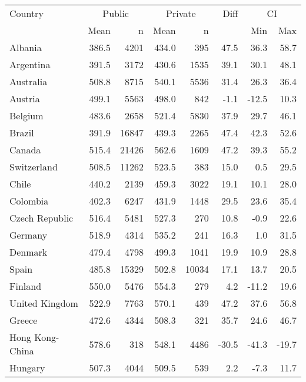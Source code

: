 \begin{table}[ht]
\begin{center}
{\smaller
\begin{tabular}{lrr@{\extracolsep{10pt}}rr@{\extracolsep{10pt}}rrr}
  \hline
  Country & \multicolumn{2}{c}{Public} & \multicolumn{2}{c}{Private} & Diff & \multicolumn{2}{c}{CI} \\ \cline{2-3} \cline{4-5} \cline{7-8} & Mean & n & Mean & n & & Min & Max \\ \hline
Albania & 386.5 & 4201 & 434.0 & 395 & 47.5 & 36.3 & 58.7 \\ 
  Argentina & 391.5 & 3172 & 430.6 & 1535 & 39.1 & 30.1 & 48.1 \\ 
  Australia & 508.8 & 8715 & 540.1 & 5536 & 31.4 & 26.3 & 36.4 \\ 
  Austria & 499.1 & 5563 & 498.0 & 842 & -1.1 & -12.5 & 10.3 \\ 
  Belgium & 483.6 & 2658 & 521.4 & 5830 & 37.9 & 29.7 & 46.1 \\ 
  Brazil & 391.9 & 16847 & 439.3 & 2265 & 47.4 & 42.3 & 52.6 \\ 
  Canada & 515.4 & 21426 & 562.6 & 1609 & 47.2 & 39.3 & 55.2 \\ 
  Switzerland & 508.5 & 11262 & 523.5 & 383 & 15.0 & 0.5 & 29.5 \\ 
  Chile & 440.2 & 2139 & 459.3 & 3022 & 19.1 & 10.1 & 28.0 \\ 
  Colombia & 402.3 & 6247 & 431.9 & 1448 & 29.5 & 23.6 & 35.4 \\ 
  Czech Republic & 516.4 & 5481 & 527.3 & 270 & 10.8 & -0.9 & 22.6 \\ 
  Germany & 518.9 & 4314 & 535.2 & 241 & 16.3 & 1.0 & 31.5 \\ 
  Denmark & 479.4 & 4798 & 499.3 & 1041 & 19.9 & 10.9 & 28.8 \\ 
  Spain & 485.8 & 15329 & 502.8 & 10034 & 17.1 & 13.7 & 20.5 \\ 
  Finland & 550.0 & 5476 & 554.3 & 279 & 4.2 & -11.2 & 19.6 \\ 
  United Kingdom & 522.9 & 7763 & 570.1 & 439 & 47.2 & 37.6 & 56.8 \\ 
  Greece & 472.6 & 4344 & 508.3 & 321 & 35.7 & 24.6 & 46.7 \\ 
  Hong Kong-China & 578.6 & 318 & 548.1 & 4486 & -30.5 & -41.3 & -19.7 \\ 
  Hungary & 507.3 & 4044 & 509.5 & 539 & 2.2 & -7.3 & 11.7 \\ 

\end{tabular}}
\end{center}
\end{table}
